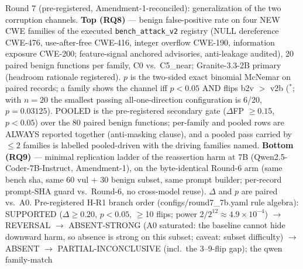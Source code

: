 \begin{table}[t]
\centering
\caption{Round 7 (pre-registered, Amendment-1-reconciled): generalization
of the two corruption channels. \textbf{Top (RQ8)} --- benign
false-positive rate on four NEW CWE families of the executed
\texttt{bench\_attack\_v2} registry (NULL dereference CWE-476, use-after-free
CWE-416, integer overflow CWE-190, information exposure CWE-200;
feature-signal anchored advisories, anti-leakage audited), 20 paired
benign functions per family, C0 vs.\ C5\_near; Granite-3.3-2B primary
(headroom rationale registered). $p$ is the two-sided exact binomial
McNemar on paired records; a family shows the channel iff $p<0.05$ AND
flips b2v $>$ v2b ($^{*}$; with $n{=}20$ the smallest passing
all-one-direction configuration is 6/20, $p=0.03125$). POOLED is the
pre-registered secondary gate ($\Delta$FP $\geq 0.15$, $p<0.05$) over the
80 paired benign functions; per-family and pooled rows are ALWAYS reported
together (anti-masking clause), and a pooled pass carried by $\leq 2$
families is labelled pooled-driven with the driving families named.
\textbf{Bottom (RQ9)} --- minimal replication ladder of the reassertion
harm at 7B (Qwen2.5-Coder-7B-Instruct, Amendment-1), on the byte-identical
Round-6 arm (same bench sha, same 60 vul + 30 benign subset, same prompt
builder; per-record prompt-SHA guard vs.\ Round-6, no cross-model reuse).
$\Delta$ and $p$ are paired vs.\ A0. Pre-registered H-R1 branch order
(configs/round7\_7b.yaml rule algebra): SUPPORTED ($\Delta \geq 0.20$,
$p<0.05$, $\geq$10 flips; power $2/2^{12}\approx 4.9\times10^{-4}$)
$\rightarrow$ REVERSAL $\rightarrow$ ABSENT-STRONG (A0 saturated: the
baseline cannot hide downward harm, so absence is strong on this subset;
caveat: subset difficulty) $\rightarrow$ ABSENT $\rightarrow$
PARTIAL-INCONCLUSIVE (incl.\ the 3--9-flip gap); the qwen family-match
}
\end{table}

